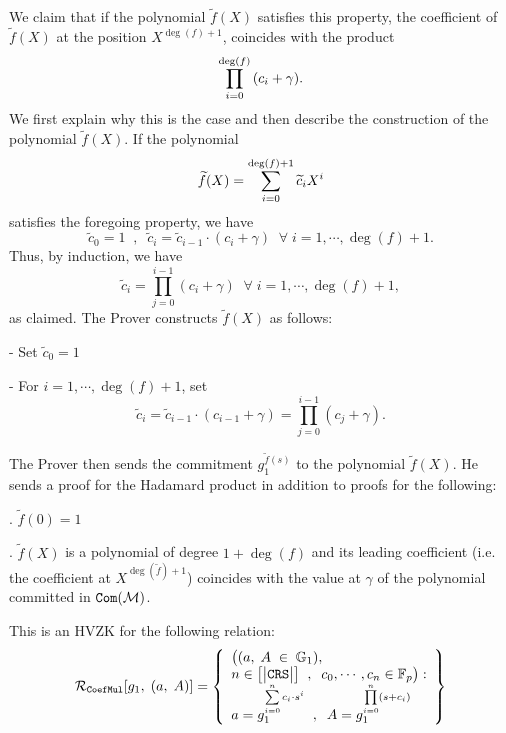 \documentclass[11pt, lettersize, notitlepage, leqno, footskip=0.6cm]{article}
\newcommand{\bFp}{\mathbb{F}_p}
\newcommand{\wti}{\widetilde}
\newcommand{\mc}{\mathcal}
\newcommand{\mb}{\mathbb}
\newcommand{\vs}{\vspace{-0.15cm}}
\newcommand{\noin}{\noindent}
\numberwithin{equation}{section}
\begin{document}
We claim that if the polynomial $\wti{f}(X)$ satisfies this property, the coefficient of $\wti{f}(X)$ at the position $X^{\deg(f)+1}$,  coincides with the product \vs $$\prod\limits_{i=0}^{\deg(f)} {(c_i+\gamma)}. \vs $$ We first explain why this is the case and then describe the construction of the polynomial $\wti{f}(X)$. If the polynomial \vs $$\wti{f}(X) = \sum\limits_{i=0}^{\deg(f)+1} \wti{c}_i X^i \vs $$ satisfies the foregoing property, we have $$ \wti{c}_0 = 1\;\;,\;\;\wti{c}_i = \wti{c}_{i-1}\cdot (c_i+\gamma)\;\;\forall\;i= 1,\cdots,\deg(f)+1  .$$ Thus, by induction, we have \vspace{-2mm} $$ \wti{c}_i = \prod\limits_{j=0}^{i-1} {(c_i+\gamma)} \;\;\forall\; i = 1,\cdots, \deg(f)+1, $$ as claimed. The Prover constructs $\wti{f}(X)$ as follows: \vspace{2mm}

\noin - Set $\wti{c}_0 = 1$ \vspace{1mm}

\noin - For $i=1,\cdots,\deg(f)+1$, set \vs $$\wti{c}_i = \wti{c}_{i-1}\cdot (c_{i-1}+\gamma) =  \prod\limits_{j=0}^{i-1} (c_j+\gamma).  $$

\noin The Prover then sends the commitment $g_1^{\wti{f}(s)}$ to the polynomial $\wti{f}(X)$. He sends a proof for the Hadamard product in addition to proofs for the following: \vspace{2mm}

\noin 1. $\wti{f}(0) = 1$ \vspace{1mm}

\noin 2. $\wti{f}(X)$ is a polynomial of degree $1+\deg(f)$ and its leading coefficient (i.e. the coefficient at $X^{\deg(\wti{f})+1}$) coincides with the value at $\gamma$ of the polynomial committed in ${\tt{Com}}(\mc{M})$. 

\bigskip

This is an HVZK for the following relation: $$\mc{R}_{\tt{CoefMul}}[g_1,\;(a,\;A)] = \left\{\begin{array}{l} \big((a,\;  A\;\in\;\mb{G}_1),\\
n \in \big[\big|  {\tt{CRS}}  \big|\big]\;\;,\;\; c_0,\cdots,c_n\in\bFp\big):\\

a = g_1^{\sum\limits_{i=0}^n c_i\cdot s^i}\;\;,\;\;A = g_1^{\prod\limits_{i=0}^n (s+c_i)}

\end{array}\right\}  $$
\end{document}
